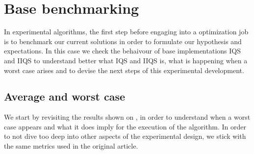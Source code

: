 \section{Base benchmarking}
\label{SUBSECTION:BASE_BENCHMARK}
In experimental algorithms, the first step before engaging into a optimization job is to benchmark our current solutions in order to formulate our hypothesis and expectations. In this case we check the behaivour of base implementations IQS and IIQS to understand better what IQS and IIQS is, what is happening when a worst case arises and to devise the next steps of this experimental development.

\subsection{Average and worst case}
\label{SUBSECTION:BASE_BENCHMARK__AVERAGE_WORST}

We start by revisiting the results shown on \cite{7416566}, in order to understand when a worst case appears and what it does imply for the execution of the algorithm. In order to not dive too deep into other aspects of the experimental design, we stick with the same metrics used in the original article.


